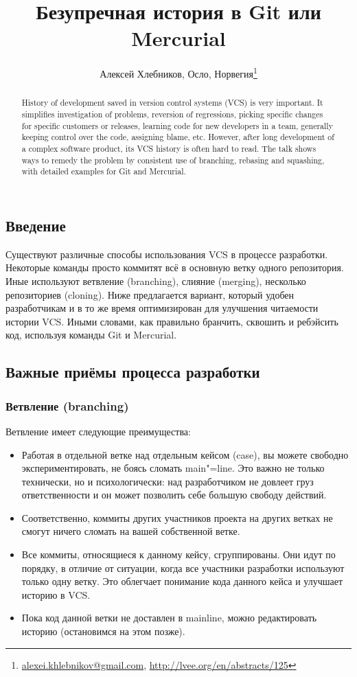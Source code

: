 \documentclass[10pt, a5paper]{article}
\begin{document}
\title{Безупречная история в Git или Mercurial}
\author{Алексей Хлебников, Осло, Норвегия\footnote{\url{alexei.khlebnikov@gmail.com}, \url{http://lvee.org/en/abstracts/125}}}
\maketitle
\begin{abstract}
History of development saved in version control systems (VCS) is very important. It simplifies investigation of problems, reversi\-on of regressions, picking specific changes for specific customers or releases, learning code for new developers in a team, generally keeping control over the code, assigning blame, etc. However, after long development of a complex software product, its VCS history is often hard to read. The talk shows  ways to remedy the problem by consistent use of branching, rebasing and squashing, with detailed examples for Git and Mercurial.
\end{abstract}
\subsection*{Введение}

Существуют различные способы использования VCS в процессе разработки. Некоторые команды просто коммитят всё в основную ветку одного репозитория. Иные используют ветвление (branching), слияние (merging), несколько репозиториев (cloning). Ниже предлагается вариант, который удобен разработчикам и в то же время оптимизирован для улучшения читаемости истории VCS. Иными словами, как правильно бранчить, сквошить и ребэйсить код, используя команды Git и Mercurial.

\subsection*{Важные приёмы процесса разработки}

\subsubsection*{Ветвление (branching)}

Ветвление имеет следующие преимущества:

\begin{itemize}
  \item Работая в отдельной ветке над отдельным кейсом (case), вы можете свободно экспериментировать, не боясь сломать main"=line. Это важно не только технически, но и психологически: над разработчиком не довлеет груз ответственности и он может позволить себе большую свободу действий.
  \item Соответственно, коммиты других участников проекта на других ветках не смогут ничего сломать на вашей собственной ветке.
  \item Все коммиты, относящиеся к данному кейсу, сгруппированы. Они идут по порядку, в отличие от ситуации, когда все участники разработки используют только одну ветку. Это облегчает понимание кода данного кейса и улучшает историю в VCS.
  \item Пока код данной ветки не доставлен в mainline, можно редактировать историю (остановимся на этом позже).
\end{itemize}
\end{document}
